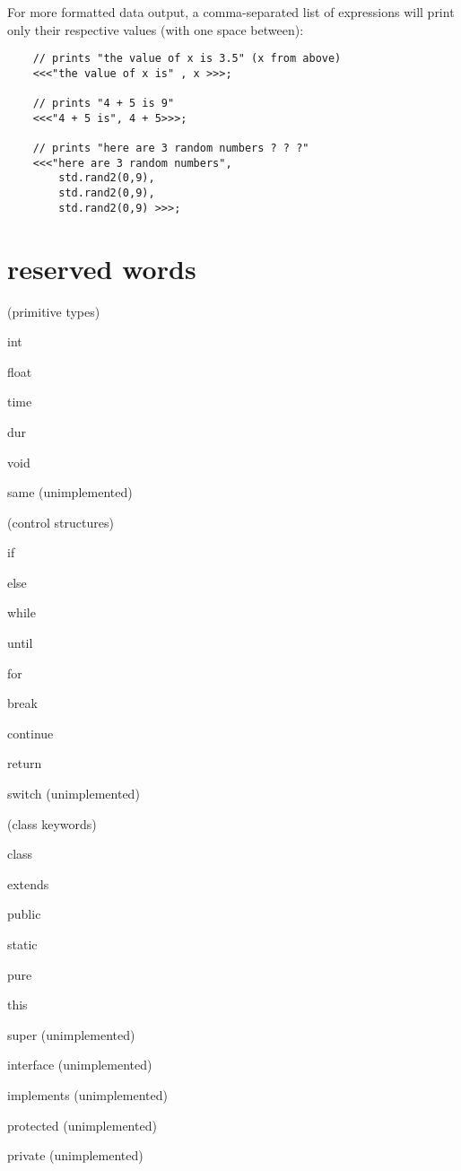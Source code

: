 For more formatted data output, a comma-separated list of expressions will print only their respective values (with one space between):
\begin{verbatim}
    // prints "the value of x is 3.5" (x from above)
    <<<"the value of x is" , x >>>;

    // prints "4 + 5 is 9"
    <<<"4 + 5 is", 4 + 5>>>;

    // prints "here are 3 random numbers ? ? ?"
    <<<"here are 3 random numbers", 
        std.rand2(0,9), 
        std.rand2(0,9),
        std.rand2(0,9) >>>; 
\end{verbatim}
 

\section{reserved words}
(primitive types) 
\begin{chuckitemize}
\item int 
\item float 
\item time 
\item dur 
\item void 
\item same (unimplemented) 
\end{chuckitemize}
(control structures) 
\begin{chuckitemize}
\item if 
\item else 
\item while 
\item until 
\item for 
\item break 
\item continue 
\item return 
\item switch (unimplemented) 
\end{chuckitemize}
(class keywords) 
\begin{chuckitemize}
\item class 
\item extends 
\item public 
\item static 
\item pure 
\item this 
\item super (unimplemented) 
\item interface (unimplemented) 
\item implements (unimplemented) 
\item protected (unimplemented) 
\item private (unimplemented) 
\end{chuckitemize}
